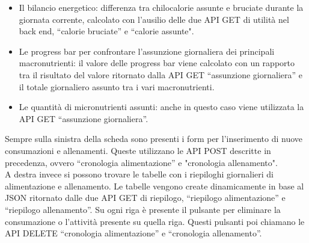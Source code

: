 \documentclass{article}
\begin{document}
   \begin{itemize}
      \item Il bilancio energetico: differenza tra chilocalorie assunte e bruciate durante la giornata corrente, calcolato con l’ausilio delle due API GET di utilità nel back end, “calorie bruciate” e “calorie assunte".
      \item Le progress bar per confrontare l’assunzione giornaliera dei principali macronutrienti: il valore delle progress bar viene calcolato con un rapporto tra il risultato del valore ritornato dalla API GET “assunzione giornaliera” e il totale giornaliero assunto tra i vari macronutrienti.
      \item Le quantità di micronutrienti assunti: anche in questo caso viene utilizzata la API GET “assunzione giornaliera”.
   \end{itemize}
   Sempre sulla sinistra della scheda sono presenti i form per l’inserimento di nuove consumazioni e allenamenti. Queste utilizzano le API POST descritte in precedenza, ovvero “cronologia alimentazione” e "cronologia allenamento".\\

   A destra invece si possono trovare le tabelle con i riepiloghi giornalieri di alimentazione e allenamento. Le tabelle vengono create dinamicamente in base al JSON ritornato dalle due API GET di riepilogo, “riepilogo alimentazione” e “riepilogo allenamento”.
   Su ogni riga è presente il pulsante per eliminare la consumazione o l’attività presente su quella riga. Questi pulsanti poi chiamano le API DELETE “cronologia alimentazione” e “cronologia allenamento”.\\
\end{document}
